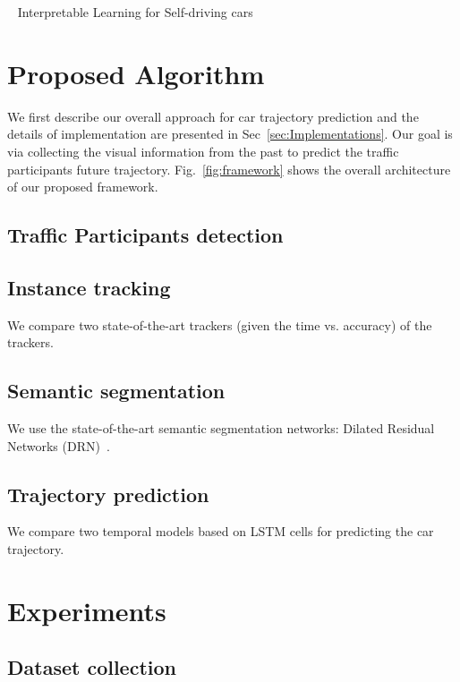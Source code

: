 \documentclass[10pt,twocolumn,letterpaper]{article}
\begin{document}
~\cite{kim2017interpretable} Interpretable Learning for Self-driving cars


\section{Proposed Algorithm}

We first describe our overall approach for car trajectory prediction and the details of implementation are presented in Sec~\ref{sec:Implementations}.
Our goal is via collecting the visual information from the past to predict the traffic participants future trajectory. Fig.~\ref{fig:framework} shows the overall architecture of our proposed framework.

\subsection{Traffic Participants detection}


\subsection{Instance tracking}

We compare two state-of-the-art trackers (given the time vs. accuracy) of the trackers.

\subsection{Semantic segmentation}
We use the state-of-the-art semantic segmentation networks: Dilated Residual Networks (DRN)~\cite{yu2017dilated}.

\subsection{Trajectory prediction}
We compare two temporal models based on LSTM cells for predicting the car trajectory.


\section{Experiments}

\subsection{Dataset collection}
\end{document}

